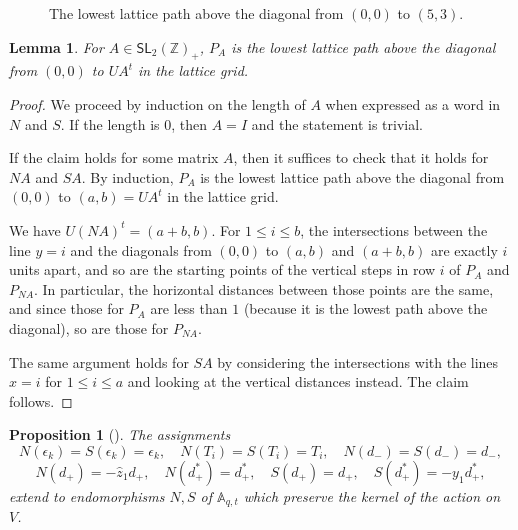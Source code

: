 \documentclass[reqno]{amsart}
\theoremstyle{plain}
\newtheorem{lemma}[theorem]{Lemma}
\newtheorem{proposition}[theorem]{Proposition}
\theoremstyle{definition}
\theoremstyle{remark}
\newcommand{\A}{\mathbb{A}}%
\newcommand{\z}{\widehat{z}}
\newcommand{\<}{\langle}
\renewcommand{\>}{\rangle}
\begin{document}
\begin{figure}
    \centering
    \caption{The lowest lattice path above the diagonal from $(0,0)$ to $(5,3)$.}
    \label{fig:lowest_path_53}
\end{figure}

\begin{lemma}
    \label{lem:lowest_path}
    For $A \in \mathsf{SL}_2(\mathbb{Z})_+$, $P_A$ is the lowest lattice path above the diagonal from $(0,0)$ to $U A^t$ in the lattice grid.
\end{lemma}

\begin{proof}
    We proceed by induction on the length of $A$ when expressed as a word in $N$ and $S$. If the length is $0$, then $A = I$ and the statement is trivial.

    If the claim holds for some matrix $A$, then it suffices to check that it holds for $NA$ and $SA$. By induction, $P_A$ is the lowest lattice path above the diagonal from $(0,0)$ to $(a,b) = U A^t$ in the lattice grid.
    
    We have $U (NA)^t = (a+b, b)$. For $1 \leq i \leq b$, the intersections between the line $y=i$ and the diagonals from $(0,0)$ to $(a,b)$ and $(a+b,b)$ are exactly $i$ units apart, and so are the starting points of the vertical steps in row $i$ of $P_A$ and $P_{NA}$. In particular, the horizontal distances between those points are the same, and since those for $P_A$ are less than $1$ (because it is the lowest path above the diagonal), so are those for $P_{NA}$.

    The same argument holds for $SA$ by considering the intersections with the lines $x=i$ for $1 \leq i \leq a$ and looking at the vertical distances instead. The claim follows.
\end{proof}

\begin{proposition}[{\cite[Proposition~3.16]{Mellit2021Rational}}]
    \label{prop:north_south}
    The assignments
    \[ N(\epsilon_k) = S(\epsilon_k) = \epsilon_k, \quad N(T_i) = S(T_i) = T_i, \quad N(d_-) = S(d_-) = d_-, \]
    \[ N(d_+) = - \z_1 d_+, \quad N(d_+^*) = d_+^*, \quad S(d_+) = d_+, \quad S(d_+^*) = -y_1 d_+^*, \]
    extend to endomorphisms $N, S$ of $\A_{q,t}$ which preserve the kernel of the action on $V$.
\end{proposition}
\end{document}
